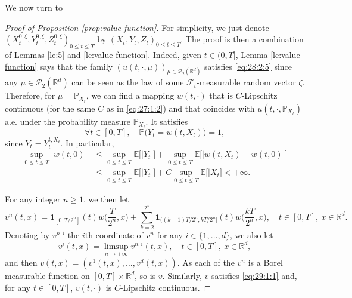 \documentclass[11pt]{amsart}
\begin{document}
We now turn to
\begin{proof}[Proof of Proposition \ref{prop:value function}]
For simplicity, we just denote $(X_{t}^{0,\xi},Y_{t}^{0,\xi},Z_{t}^{0,\xi})_{0 \leq t \leq T}$
by $(X_{t},Y_{t},Z_{t})_{0 \leq t \leq T}$.
The proof is then a combination of Lemmas
\ref{le:5}
and \ref{le:value function}.  
Indeed, given $t \in (0,T]$, Lemma 
\ref{le:value function} says that the family $(u(t,\cdot,\mu))_{\mu \in {\mathcal P}_{2}({\mathbb R}^d)}$
satisfies \eqref{eq:28:2:5} since any $\mu \in {\mathcal P}_{2}({\mathbb R}^d)$ can be seen as the law of some ${\mathcal F}_{t}$-measurable random vector $\zeta$. Therefore, for $\mu={\mathbb P}_{X_{t}}$, we can find a mapping $w(t,\cdot)$ that is $C$-Lipschitz continuous (for the same $C$ as in \eqref{eq:27:1:2}) and that 
 coincides with $u(t,\cdot,{\mathbb P}_{X_{t}})$ a.e. under the probability measure ${\mathbb P}_{X_{t}}$. It satisfies
 \begin{equation}
 \label{eq:5:2:1}
 \forall t \in [0,T], \quad {\mathbb P} \bigl( Y_{t} = w(t,X_{t}) \bigr) = 1, 
 \end{equation}
 since $Y_{t}=Y_{t}^{t,X_{t}}$.  In particular,
 \begin{equation}
 \label{eq:29:1:1}
 \begin{split}
\sup_{0 \leq t \leq T} \vert w(t,0) \vert &\leq  
 \sup_{0 \leq t \leq T} {\mathbb E} \bigl[ \vert Y_{t} \vert \bigr] +  \sup_{0 \leq t \leq T} 
 {\mathbb E} \bigl[\vert w(t,X_{t}) - w(t,0) \vert \bigr]
 \\
 &\leq \sup_{0 \leq t \leq T} {\mathbb E} \bigl[ \vert Y_{t} \vert \bigr] + C \sup_{0 \leq t \leq T} 
 {\mathbb E} \bigl[\vert X_{t} \bigr] < + \infty.  
 \end{split}
 \end{equation}

For any integer $n \geq 1$, we then let
\begin{equation*}
v^n(t,x) =  {\mathbf 1}_{[0,T/2^n]}(t) w\bigl( \frac{T}{2^n},x \bigr) + 
\sum_{k=2}^{2^n} {\mathbf 1}_{((k-1)T/2^n,kT/2^n]}(t) w\bigl( \frac{kT}{2^n},x \bigr), \quad t \in [0,T], \ x \in {\mathbb R}^d. 
\end{equation*}
Denoting by $v^{n,i}$ the $i$th coordinate of $v^n$ for any $i \in \{1,\dots,d\}$, we also let
\begin{equation*}
v^i(t,x) = \limsup_{n \rightarrow + \infty} v^{n,i}(t,x), \quad t \in [0,T], \ x \in {\mathbb R}^d, 
\end{equation*}
and then $v(t,x)= (v^1(t,x),\dots,v^d(t,x))$. As each of the $v^n$ is a Borel measurable function on $[0,T] \times {\mathbb R}^d$, so is $v$. Similarly, $v$ satisfies \eqref{eq:29:1:1} and, for any $t \in [0,T]$, $v(t,\cdot)$ is $C$-Lipschitz continuous. 


\end{proof}
\end{document}
